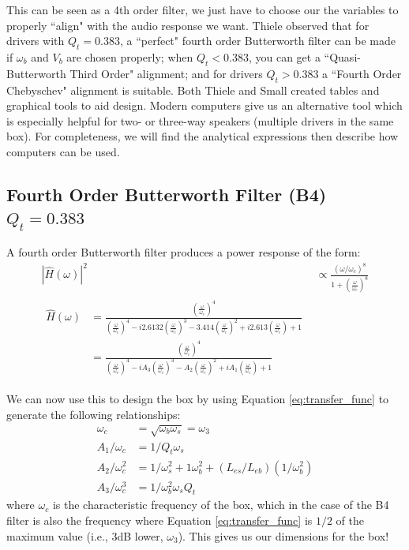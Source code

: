 \documentclass[10pt]{book}
\begin{document}

This can be seen as a 4th order filter, we just have to choose our the variables to properly ``align" with the audio response we want. Thiele observed that for drivers with $Q_t=0.383$, a ``perfect" fourth order Butterworth filter can be made if $\omega_b$ and $V_b$ are chosen properly; when $Q_t<0.383$, you can get a ``Quasi-Butterworth Third Order" alignment; and for drivers $Q_t>0.383$ a ``Fourth Order Chebyschev" alignment is suitable. Both Thiele and Small created tables and graphical tools to aid design. Modern computers give us an alternative tool which is especially helpful for two- or three-way speakers (multiple drivers in the same box). For completeness, we will find the analytical expressions then describe how computers can be used.

\subsection{Fourth Order Butterworth Filter (B4) \texorpdfstring{\\$Q_t=0.383$}{Qt=0.383}} A fourth order Butterworth filter produces a power response of the form:
\begin{align}
\left|  \hat{H}(\omega) \right|^2&\propto \frac{(\omega/\omega_c)^8}{1+\left(\frac{\omega}{\omega_c}\right)^8}\label{eq:transfer_func}\\
\begin{split}
\hat{H}(\omega)&=\frac{(\frac{\omega}{\omega_c})^4}{(\frac{\omega}{\omega_c})^4-i2.6132(\frac{\omega}{\omega_c})^3-3.414(\frac{\omega}{\omega_c})^2+i2.613(\frac{\omega}{\omega_c})+1}\\
&=\frac{(\frac{\omega}{\omega_c})^4}{(\frac{\omega}{\omega_c})^4-iA_3(\frac{\omega}{\omega_c})^3-A_2(\frac{\omega}{\omega_c})^2+iA_1(\frac{\omega}{\omega_c})+1}
\end{split}
\end{align}

We can now use this to design the box by using Equation \ref{eq:transfer_func} to generate the following relationships:
\begin{align}
\omega_c&=\sqrt{\omega_b \omega_s}=\omega_3\\
A_1/\omega_c&=1/Q_t\omega_s\\
A_2/\omega_c^2&=1/\omega_s^2+1\omega_b^2+(L_{es}/L_{eb})(1/\omega_b^2)\\
A_3/\omega_c^3&=1/\omega_b^2\omega_sQ_t
\end{align}
where $\omega_c$ is the characteristic frequency of the box, which in the case of the B4 filter is also the frequency where Equation \ref{eq:transfer_func} is $1/2$ of the maximum value (i.e., 3dB lower, $\omega_3$). This gives us our dimensions for the box!
\end{document}
